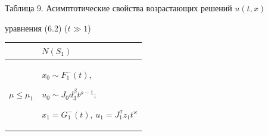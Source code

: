  





 


\begin{center} 


Таблица 9. Асимптотические свойства возрастающих решений $u(t,x)$ 


уравнения (6.2) ($t\gg1$) 


\begin{tabular}{|p{2.6cm}|p{13cm}|} 


\hline 


\ & \hspace*{6cm}$N(S_1)$ \\ 


\hline 


$\mu\le\mu_1$ & 


\parbox{13cm}{$x_0\sim F^-_1(t)$, 


$u_0\sim J_0d^\beta_3t^{\rho-1}$; 


$x_1=G^-_1(t)$, $u_1=J^\sigma_1z_1t^\varkappa$} \\ 


\hline 


$\mu_2<\mu<0$ & 


\parbox{13cm}{$x_0\sim-\beta^{-1}\big( 


-\frac{2\chi}{J^2_0}\big)^{1/\varphi}t^{\rho+\varkappa-1}$, 


$u_0\sim\big(-\frac{1}{2\chi}\big)^{\beta/2} 


J_0^{\beta+1}t^{(\rho+\varkappa-1)/2}$; 


$x_1=\infty$, $u_1=\infty$} \\ 


\hline 


\ & \hspace*{6cm}$N(S_2)$\\ 


\hline 


$\mu\le\mu_2$ & 


\parbox{13cm}{$x_0\sim -\beta^{-1}\big(- 


\frac{2\chi}{J^2_0}\big)^{1/\varphi} 


t^{\rho+\varkappa-1}$, $u_0\sim\big(- 


\frac{1}{2\chi}\big)^{\beta/2}J_0^{\beta+1} 


t^{(\rho+\varkappa-1)/2}$; $x_1=G^-_2(t)$, \\


$u_1=J^\sigma_1z_2t^\varkappa$}\\ 



\end{tabular}
\end{center}
